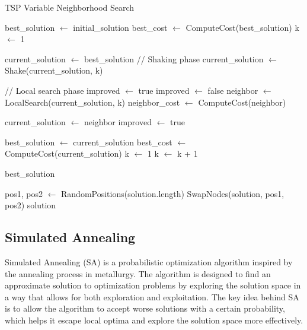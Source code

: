 \documentclass{article}
\begin{document}
\begin{algorithm}
\caption{TSP Variable Neighborhood Search}
\begin{algorithmic}[1]
\State best\_solution $\gets$ initial\_solution
\State best\_cost $\gets$ ComputeCost(best\_solution)
\State k $\gets$ 1

    \State current\_solution $\gets$ best\_solution
    \State // Shaking phase
    \State current\_solution $\gets$ Shake(current\_solution, k)
    
    \State // Local search phase
    \State improved $\gets$ true
        \State improved $\gets$ false
        \State neighbor $\gets$ LocalSearch(current\_solution, k)
        \State neighbor\_cost $\gets$ ComputeCost(neighbor)
        
            \State current\_solution $\gets$ neighbor
            \State improved $\gets$ true
        \EndIf
    \EndWhile

        \State best\_solution $\gets$ current\_solution
        \State best\_cost $\gets$ ComputeCost(current\_solution)
        \State k $\gets$ 1
    \Else
        \State k $\gets$ k + 1
    \EndIf
\EndWhile

\State \Return best\_solution
\EndProcedure

        \State pos1, pos2 $\gets$ RandomPositions(solution.length)
        \State SwapNodes(solution, pos1, pos2)
    \EndFor
    \State \Return solution
\EndFunction
\end{algorithmic}
\end{algorithm}
\newpage

\subsection{Simulated Annealing}
Simulated Annealing (SA) is a probabilistic optimization algorithm inspired by the annealing process in metallurgy.
The algorithm is designed to find an approximate solution to optimization problems by exploring the solution space in a way that allows for both exploration and exploitation.
The key idea behind SA is to allow the algorithm to accept worse solutions with a certain probability,
which helps it escape local optima and explore the solution space more effectively.
\end{document}
